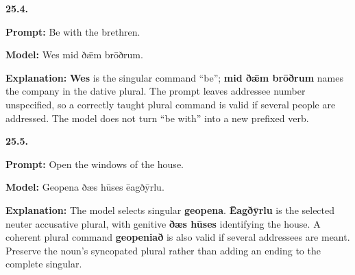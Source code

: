 \par\begin{minipage}{\linewidth}\raggedright
\textbf{25.4.}

\textbf{Prompt:} Be with the brethren.

\textbf{Model:} Wes mid ðǣm brōðrum.

\textbf{Explanation:} \textbf{Wes} is the singular command “be”; \textbf{mid ðǣm brōðrum} names the company in the dative plural. The prompt leaves addressee number unspecified, so a correctly taught plural command is valid if several people are addressed. The model does not turn “be with” into a new prefixed verb.

\end{minipage}\par\addvspace{4pt}

\par\begin{minipage}{\linewidth}\raggedright
\textbf{25.5.}

\textbf{Prompt:} Open the windows of the house.

\textbf{Model:} Geopena ðæs hūses ēagðȳrlu.

\textbf{Explanation:} The model selects singular \textbf{geopena}. \textbf{Ēagðȳrlu} is the selected neuter accusative plural, with genitive \textbf{ðæs hūses} identifying the house. A coherent plural command \textbf{geopeniað} is also valid if several addressees are meant. Preserve the noun’s syncopated plural rather than adding an ending to the complete singular.

\end{minipage}\par\addvspace{4pt}

